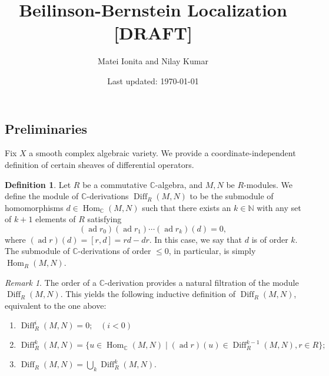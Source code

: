 \documentclass{article}
\newcommand{\C}{\mathbb{C}}
\newcommand{\N}{\mathbb{N}}
\theoremstyle{plain}
\theoremstyle{definition}
\newtheorem{definition}[theorem]{Definition}
\theoremstyle{remark}
\newtheorem*{remark}{Remark}
\DeclareMathOperator{\Hom}{Hom}
\DeclareMathOperator{\Diff}{Diff}
\DeclareMathOperator{\ad}{ad}
\begin{document}
\title{Beilinson-Bernstein Localization [DRAFT]}
\author{Matei Ionita and Nilay Kumar}
\date{Last updated: \today}

\maketitle

\subsection{Preliminaries}

Fix $X$ a smooth complex algebraic variety. We provide a coordinate-independent definition
of certain sheaves of differential operators.

\begin{definition}
    Let $R$ be a commutative $\C$-algebra, and $M,N$ be $R$-modules.
    We define the module of $\C$-derivations $\Diff_R(M,N)$ to be the submodule
    of homomorphisms $d\in\Hom_\C(M,N)$ such that there exists an $k\in\N$ with any set
    of $k+1$ elements of $R$ satisfying
    \[(\ad r_0)(\ad r_1)\cdots(\ad r_k)(d)=0,\]
    where $(\ad r)(d)=[r,d]=rd-dr$. In this case, we say that $d$ is of order $k$.
    The submodule of $\C$-derivations of order $\leqslant 0$, in particular, is simply
    $\Hom_R(M,N)$.
    \label{def:derivations}
\end{definition}

\begin{remark}
    The order of a $\C$-derivation provides a natural filtration of the module $\Diff_R(M,N)$.
    This yields the following inductive definition of $\Diff_R(M,N)$, equivalent to the one
    above:
    \begin{enumerate}
        \item[] $\Diff^{i}_R(M,N) = 0; \;\;\;(i<0)$
        \item[] $\Diff^k_R(M,N) = \{u\in\Hom_\C(M,N)\mid (\ad r)(u)\in \Diff^{k-1}_R(M,N), r\in R\};$
        \item[] $\Diff_R(M,N)=\bigcup_k\Diff^k_R(M,N)$.
    \end{enumerate}
\end{remark}
\end{document}
